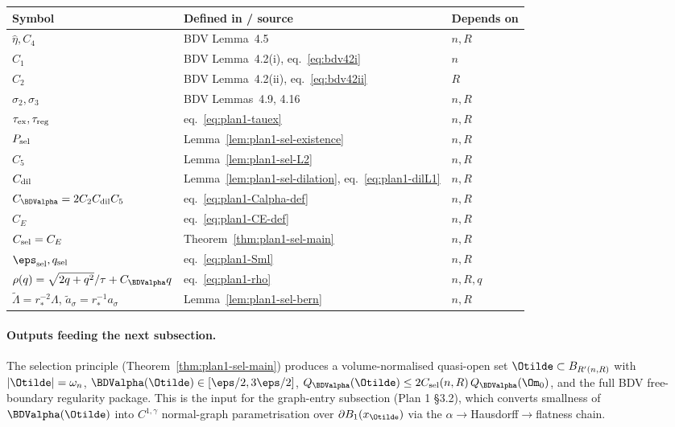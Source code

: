 \begin{center}
\renewcommand{\arraystretch}{1.20}
\begin{tabular}{|l|l|l|}
\hline
Symbol & Defined in / source & Depends on \\\hline
$\hat\eta,C_4$ & BDV Lemma~4.5 & $n,R$ \\
$C_1$ & BDV Lemma~4.2(i), eq.~\eqref{eq:bdv42i} & $n$ \\
$C_2$ & BDV Lemma~4.2(ii), eq.~\eqref{eq:bdv42ii} & $R$ \\
$\sigma_2,\sigma_3$ & BDV Lemmas~4.9, 4.16 & $n,R$ \\
$\tau_{\rm ex},\tau_{\rm reg}$ & eq.~\eqref{eq:plan1-tauex} & $n,R$ \\
$P_{\rm sel}$ & Lemma~\ref{lem:plan1-sel-existence} & $n,R$ \\
$C_5$ & Lemma~\ref{lem:plan1-sel-L2} & $n,R$ \\
$C_{\rm dil}$ & Lemma~\ref{lem:plan1-sel-dilation},
eq.~\eqref{eq:plan1-dilL1} & $n,R$ \\
$C_{\BDValpha}=2 C_2 C_{\rm dil}C_5$ & eq.~\eqref{eq:plan1-Calpha-def} & $n,R$ \\
$C_E$ & eq.~\eqref{eq:plan1-CE-def} & $n,R$ \\
$C_{\rm sel}=C_E$ & Theorem~\ref{thm:plan1-sel-main} & $n,R$ \\
$\eps_{\rm sel},q_{\rm sel}$ & eq.~\eqref{eq:plan1-Sml} & $n,R$ \\
$\rho(q)=\sqrt{2q+q^2}/\tau+C_{\BDValpha}q$ &
eq.~\eqref{eq:plan1-rho} & $n,R,q$ \\
$\tilde\Lambda=r_*^{-2}\Lambda$,
$\tilde a_\sigma=r_*^{-1}a_\sigma$ &
Lemma~\ref{lem:plan1-sel-bern} & $n,R$ \\
\hline
\end{tabular}
\end{center}

\paragraph{Outputs feeding the next subsection.}
The selection principle (Theorem~\ref{thm:plan1-sel-main}) produces a
volume-normalised quasi-open set $\Otilde\subset B_{R'(n,R)}$ with
$|\Otilde|=\omega_n$, $\BDValpha(\Otilde)\in[\eps/2,3\eps/2]$,
$Q_{\BDValpha}(\Otilde)\le 2C_{\rm sel}(n,R)\,Q_{\BDValpha}(\Om_0)$, and
the full BDV free-boundary regularity package. This is the input for
the graph-entry subsection (Plan 1 \S 3.2), which converts smallness of
$\BDValpha(\Otilde)$ into $C^{1,\gamma}$ normal-graph parametrisation
over $\partial B_1(x_{\Otilde})$ via the
$\alpha\to$Hausdorff$\to$flatness chain.
